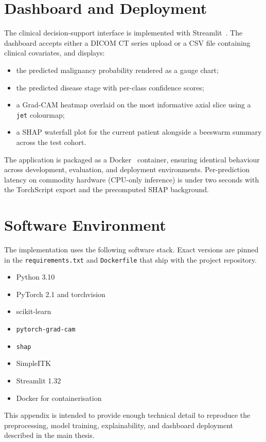 \section{Dashboard and Deployment}
\label{sec:appB-dashboard}

The clinical decision-support interface is implemented with
Streamlit~\cite{streamlit2021}. The dashboard accepts either a DICOM CT
series upload or a CSV file containing clinical covariates, and displays:

\begin{itemize}
    \item the predicted malignancy probability rendered as a gauge chart;
    \item the predicted disease stage with per-class confidence scores;
    \item a Grad-CAM heatmap overlaid on the most informative axial slice
          using a \texttt{jet} colourmap;
    \item a SHAP waterfall plot for the current patient alongside a beeswarm
          summary across the test cohort.
\end{itemize}

The application is packaged as a Docker~\cite{docker2020} container,
ensuring identical behaviour across development, evaluation, and deployment
environments. Per-prediction latency on commodity hardware (CPU-only
inference) is under two seconds with the TorchScript export and the
precomputed SHAP background.

\section{Software Environment}
\label{sec:appB-software}

The implementation uses the following software stack. Exact versions are
pinned in the \texttt{requirements.txt} and \texttt{Dockerfile} that ship
with the project repository.

\begin{itemize}
    \item Python 3.10
    \item PyTorch 2.1 and torchvision~\cite{paszke2019pytorch}
    \item scikit-learn~\cite{pedregosa2011scikit}
    \item \texttt{pytorch-grad-cam}~\cite{selvaraju2017grad}
    \item \texttt{shap}~\cite{lundberg2017unified}
    \item SimpleITK~\cite{muschelli2014simpleitk}
    \item Streamlit 1.32~\cite{streamlit2021}
    \item Docker for containerisation~\cite{docker2020}
\end{itemize}

This appendix is intended to provide enough technical detail to reproduce
the preprocessing, model training, explainability, and dashboard deployment
described in the main thesis.